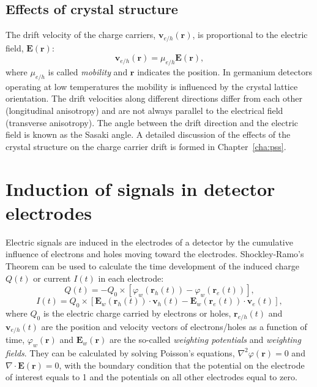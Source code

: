 \subsection{Effects of crystal structure}
\label{sec:det:struc}
The drift velocity of the charge carriers, $\mathbf{v}_{e/h}(\mathbf{r})$, is proportional to the electric field, $\mathbf{E}(\mathbf{r})$:
\begin{equation} 
\label{eq:det:dv}
\mathbf{v}_{e/h} (\mathbf{r})= \mu_{e/h} \mathbf{E}(\mathbf{r}),
\end{equation}
where $\mu_{e/h}$ is called \emph{mobility} and $\mathbf{r}$ indicates the position. In germanium detectors operating at low temperatures the mobility is influenced by the crystal lattice orientation. The drift velocities along different directions differ from each other (longitudinal anisotropy) and are not always parallel to the electrical field (transverse anisotropy). The angle between the drift direction and the electric field is known as the Sasaki angle\cite{Sas56}. A detailed discussion of the effects of the crystal structure on the charge carrier drift is formed in Chapter~\ref{cha:pss}.

\section{Induction of signals in detector electrodes}
\label{sec:det:ramo}
Electric signals are induced in the electrodes of a detector by the cumulative influence of electrons and holes moving toward the electrodes. Shockley-Ramo's Theorem \cite{Gat82, Rad88, He00} can be used to calculate the time development of the induced charge $Q(t)$ or current $I(t)$ in each electrode:
\begin{equation} 
\label{eq:det:ramoq}
Q(t) = -Q_{0} \times [\varphi_{w}(\mathbf{r}_{h}(t)) - \varphi_{w}(\mathbf{r}_{e}(t))],
\end{equation}
\begin{equation} 
\label{eq:det:ramoi}
I(t) = Q_{0} \times [\mathbf{E}_{w}(\mathbf{r}_{h}(t)) \cdot \mathbf{v}_{h}(t) - \mathbf{E}_{w}(\mathbf{r}_{e}(t)) \cdot \mathbf{v}_{e}(t)],
\end{equation}
where $Q_{0}$ is the electric charge carried by electrons or holes, $\mathbf{r}_{e/h}(t)$ and $\mathbf{v}_{e/h}(t)$ are the position and velocity vectors of electrons/holes as a function of time, $\varphi_{w}(\mathbf{r})$ and $\mathbf{E}_{w}(\mathbf{r})$ are the so-called \emph{weighting potentials} and \emph{weighting fields}. They can be calculated by solving Poisson's equations, $\nabla^{2} \varphi(\mathbf{r}) = 0$ and $\nabla \cdot \mathbf{E}(\mathbf{r}) = 0$, with the boundary condition that the potential on the electrode of interest equals to 1 and the potentials on all other electrodes equal to zero.

